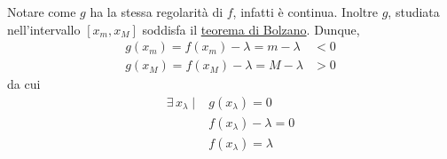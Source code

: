 \documentclass[../../dimostrazioni]{subfiles}
\begin{document}
            Notare come \(g\) ha la stessa regolarità di \(f\), infatti è continua. Inoltre \(g\), studiata
            nell'intervallo \([x_m, x_M]\) soddisfa il \hyperref[teoBolzano]{teorema di Bolzano}. Dunque,
            \begin{align*}
                g(x_m) = f(x_m) - \lambda = m - \lambda &< 0\\
                g(x_M) = f(x_M) - \lambda = M - \lambda &> 0
            \end{align*}
            da cui
            \begin{align*}
                \exists \, x_\lambda \; | \; &g(x_\lambda) = 0\\
                &f(x_\lambda) - \lambda = 0\\
                &f(x_\lambda) = \lambda
            \end{align*}
        
\end{document}
